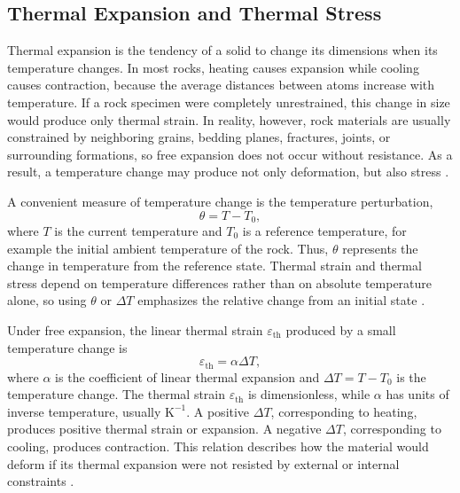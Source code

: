 \subsection{Thermal Expansion and Thermal Stress}

Thermal expansion is the tendency of a solid to change its dimensions when its temperature changes. In most rocks, heating causes expansion while cooling causes contraction, because the average distances between atoms increase with temperature. If a rock specimen were completely unrestrained, this change in size would produce only thermal strain. In reality, however, rock materials are usually constrained by neighboring grains, bedding planes, fractures, joints, or surrounding formations, so free expansion does not occur without resistance. As a result, a temperature change may produce not only deformation, but also stress \cite{boley1960,nowacki1986,jaeger2007}.

A convenient measure of temperature change is the temperature perturbation,
\begin{equation}
\label{eq:theta-def}
\theta = T - T_0,
\end{equation}
where \(T\) is the current temperature and \(T_0\) is a reference temperature, for example the initial ambient temperature of the rock. Thus, \(\theta\) represents the change in temperature from the reference state. Thermal strain and thermal stress depend on temperature differences rather than on absolute temperature alone, so using \(\theta\) or \(\Delta T\) emphasizes the relative change from an initial state \cite{boley1960,nowacki1986}.

Under free expansion, the linear thermal strain \(\varepsilon_{\mathrm{th}}\) produced by a small temperature change is
\begin{equation}
\label{eq:eps-thermal}
\varepsilon_{\mathrm{th}} = \alpha \Delta T,
\end{equation}
where \(\alpha\) is the coefficient of linear thermal expansion and \(\Delta T = T - T_0\) is the temperature change. The thermal strain \(\varepsilon_{\mathrm{th}}\) is dimensionless, while \(\alpha\) has units of inverse temperature, usually \(\mathrm{K^{-1}}\). A positive \(\Delta T\), corresponding to heating, produces positive thermal strain or expansion. A negative \(\Delta T\), corresponding to cooling, produces contraction. This relation describes how the material would deform if its thermal expansion were not resisted by external or internal constraints \cite{boley1960,jaeger2007}.

